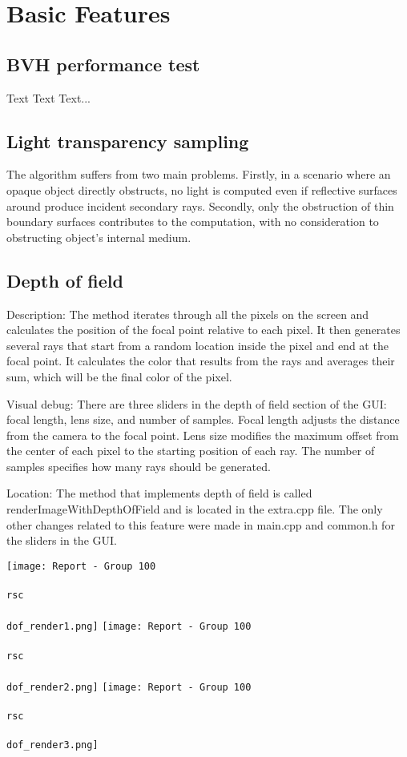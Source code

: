 \section{Basic Features}
\subsection{BVH performance test}
Text Text Text...
\subsection{Light transparency sampling}
The algorithm suffers from two main problems. Firstly, in a scenario where an opaque object directly obstructs, no light is computed even if reflective surfaces around produce incident secondary rays. Secondly, only the obstruction of thin boundary surfaces contributes to the computation, with no consideration to obstructing object's internal medium.
\subsection{Depth of field}
Description:
The method iterates through all the pixels on the screen and calculates the position of the focal point relative to each pixel. It then generates several rays that start from a random location inside the pixel and end at the focal point. It calculates the color that results from the rays and averages their sum, which will be the final color of the pixel.

Visual debug:
There are three sliders in the depth of field section of the GUI: focal length, lens size, and number of samples. Focal length adjusts the distance from the camera to the focal point. Lens size modifies the maximum offset from the center of each pixel to the starting position of each ray. The number of samples specifies how many rays should be generated.

Location:
The method that implements depth of field is called renderImageWithDepthOfField and is located in the extra.cpp file. The only other changes related to this feature were made in main.cpp and common.h for the sliders in the GUI.

\texttt{[image: Report - Group 100\\\\rsc\\\\dof\_render1.png]}
\texttt{[image: Report - Group 100\\\\rsc\\\\dof\_render2.png]}
\texttt{[image: Report - Group 100\\\\rsc\\\\dof\_render3.png]}